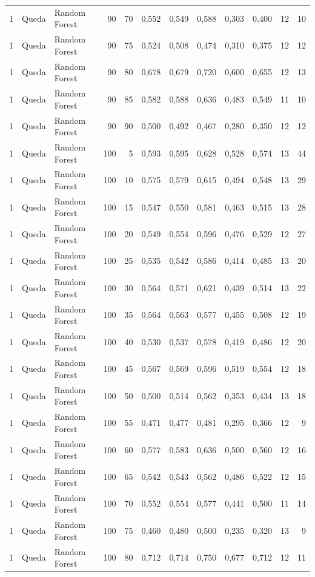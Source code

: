 \begin{longtable}{@{}rllrrrrrrrrr@{}}
1 & Queda & Random Forest & 90 & 70 & 0,552 & 0,549 & 0,588 & 0,303 & 0,400 & 12 & 10 \\
1 & Queda & Random Forest & 90 & 75 & 0,524 & 0,508 & 0,474 & 0,310 & 0,375 & 12 & 12 \\
1 & Queda & Random Forest & 90 & 80 & 0,678 & 0,679 & 0,720 & 0,600 & 0,655 & 12 & 13 \\
1 & Queda & Random Forest & 90 & 85 & 0,582 & 0,588 & 0,636 & 0,483 & 0,549 & 11 & 10 \\
1 & Queda & Random Forest & 90 & 90 & 0,500 & 0,492 & 0,467 & 0,280 & 0,350 & 12 & 12 \\
1 & Queda & Random Forest & 100 & 5 & 0,593 & 0,595 & 0,628 & 0,528 & 0,574 & 13 & 44 \\
1 & Queda & Random Forest & 100 & 10 & 0,575 & 0,579 & 0,615 & 0,494 & 0,548 & 13 & 29 \\
1 & Queda & Random Forest & 100 & 15 & 0,547 & 0,550 & 0,581 & 0,463 & 0,515 & 13 & 28 \\
1 & Queda & Random Forest & 100 & 20 & 0,549 & 0,554 & 0,596 & 0,476 & 0,529 & 12 & 27 \\
1 & Queda & Random Forest & 100 & 25 & 0,535 & 0,542 & 0,586 & 0,414 & 0,485 & 13 & 20 \\
1 & Queda & Random Forest & 100 & 30 & 0,564 & 0,571 & 0,621 & 0,439 & 0,514 & 13 & 22 \\
1 & Queda & Random Forest & 100 & 35 & 0,564 & 0,563 & 0,577 & 0,455 & 0,508 & 12 & 19 \\
1 & Queda & Random Forest & 100 & 40 & 0,530 & 0,537 & 0,578 & 0,419 & 0,486 & 12 & 20 \\
1 & Queda & Random Forest & 100 & 45 & 0,567 & 0,569 & 0,596 & 0,519 & 0,554 & 12 & 18 \\
1 & Queda & Random Forest & 100 & 50 & 0,500 & 0,514 & 0,562 & 0,353 & 0,434 & 13 & 18 \\
1 & Queda & Random Forest & 100 & 55 & 0,471 & 0,477 & 0,481 & 0,295 & 0,366 & 12 & 9 \\
1 & Queda & Random Forest & 100 & 60 & 0,577 & 0,583 & 0,636 & 0,500 & 0,560 & 12 & 16 \\
1 & Queda & Random Forest & 100 & 65 & 0,542 & 0,543 & 0,562 & 0,486 & 0,522 & 12 & 15 \\
1 & Queda & Random Forest & 100 & 70 & 0,552 & 0,554 & 0,577 & 0,441 & 0,500 & 11 & 14 \\
1 & Queda & Random Forest & 100 & 75 & 0,460 & 0,480 & 0,500 & 0,235 & 0,320 & 13 & 9 \\
1 & Queda & Random Forest & 100 & 80 & 0,712 & 0,714 & 0,750 & 0,677 & 0,712 & 12 & 11 \\

\end{longtable}
